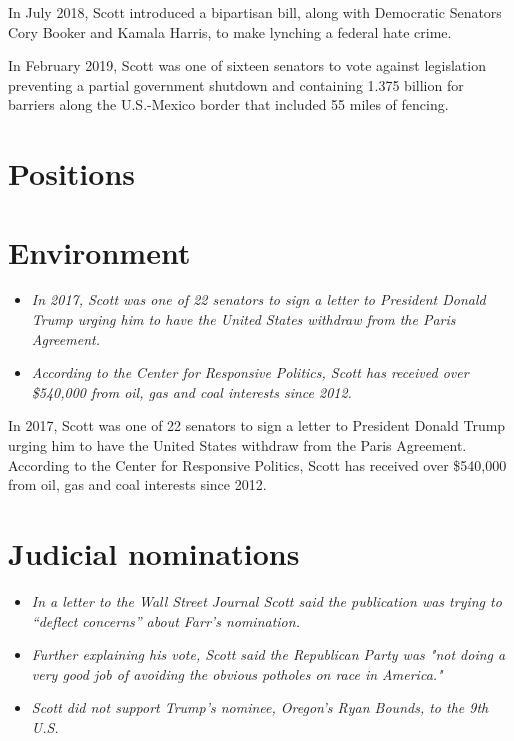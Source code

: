 In July 2018, Scott introduced a bipartisan bill, along with Democratic
Senators Cory Booker and Kamala Harris, to make lynching a federal hate
crime.

In February 2019, Scott was one of sixteen senators to vote against
legislation preventing a partial government shutdown and containing
1.375 billion for barriers along the U.S.-Mexico border that included 55
miles of fencing.

\section{Positions}\label{positions}

\section{Environment}\label{environment}

\begin{itemize}
\item
  \emph{In 2017, Scott was one of 22 senators to sign a letter to
  President Donald Trump urging him to have the United States withdraw
  from the Paris Agreement.}
\item
  \emph{According to the Center for Responsive Politics, Scott has
  received over \$540,000 from oil, gas and coal interests since 2012.}
\end{itemize}

In 2017, Scott was one of 22 senators to sign a letter to President
Donald Trump urging him to have the United States withdraw from the
Paris Agreement. According to the Center for Responsive Politics, Scott
has received over \$540,000 from oil, gas and coal interests since 2012.

\section{Judicial nominations}\label{judicial-nominations}

\begin{itemize}
\item
  \emph{In a letter to the Wall Street Journal Scott said the
  publication was trying to ``deflect concerns'' about Farr's
  nomination.}
\item
  \emph{Further explaining his vote, Scott said the Republican Party was
  "not doing a very good job of avoiding the obvious potholes on race in
  America."}
\item
  \emph{Scott did not support Trump's nominee, Oregon's Ryan Bounds, to
  the 9th U.S.}
\end{itemize}


